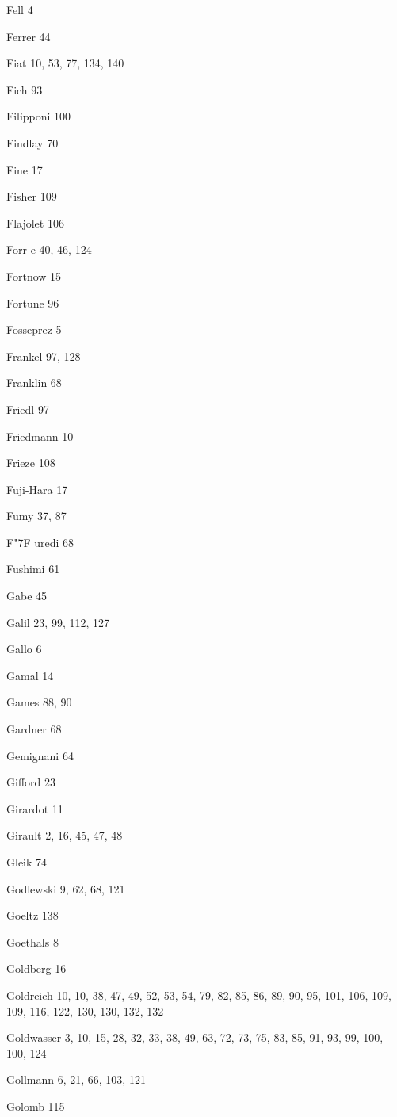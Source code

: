 \begin{theindex}
\item Fell 4
\item Ferrer 44
\item Fiat 10, 53, 77, 134, 140
\item Fich 93
\item Filipponi 100
\item Findlay 70
\item Fine 17
\item Fisher 109
\item Flajolet 106
\item Forr{ e} 40, 46, 124
\item Fortnow 15
\item Fortune 96
\item Fosseprez 5
\item Frankel 97, 128
\item Franklin 68
\item Friedl 97
\item Friedmann 10
\item Frieze 108
\item Fuji-Hara 17
\item Fumy 37, 87
\item F{\accent "7F u}redi 68
\item Fushimi 61
\item Gabe 45
\item Galil 23, 99, 112, 127
\item Gallo 6
\item Gamal 14
\item Games 88, 90
\item Gardner 68
\item Gemignani 64
\item Gifford 23
\item Girardot 11
\item Girault 2, 16, 45, 47, 48
\item Gleik 74
\item Godlewski 9, 62, 68, 121
\item Goeltz 138
\item Goethals 8
\item Goldberg 16
\item Goldreich 10, 10, 38, 47, 49, 52, 53, 54, 79, 82, 85, 86, 89, 90, 95, 101, 106, 109, 109, 116, 122, 130, 130, 132, 132
\item Goldwasser 3, 10, 15, 28, 32, 33, 38, 49, 63, 72, 73, 75, 83, 85, 91, 93, 99, 100, 100, 124
\item Gollmann 6, 21, 66, 103, 121
\item Golomb 115

\end{theindex}
